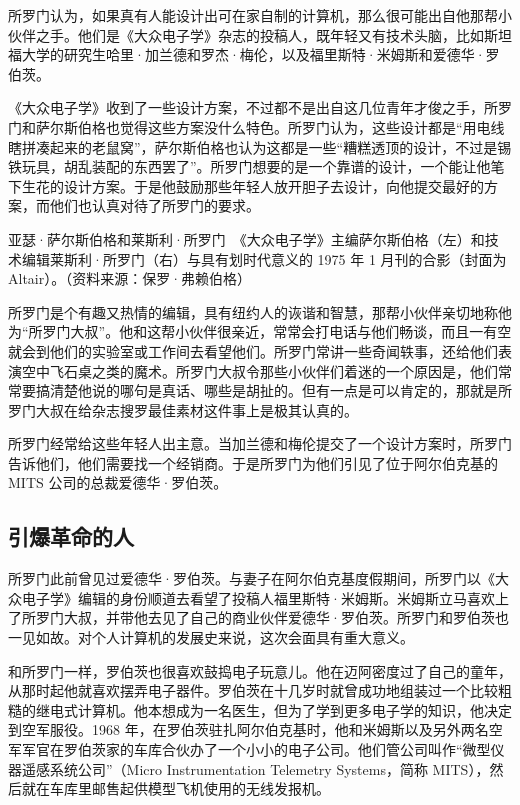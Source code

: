 \documentclass[12pt,UTF8]{ctexbook}
\begin{document}
所罗门认为，如果真有人能设计出可在家自制的计算机，那么很可能出自他那帮小伙伴之手。他们是《大众电子学》杂志的投稿人，既年轻又有技术头脑，比如斯坦福大学的研究生哈里·加兰德和罗杰·梅伦，以及福里斯特·米姆斯和爱德华·罗伯茨。

《大众电子学》收到了一些设计方案，不过都不是出自这几位青年才俊之手，所罗门和萨尔斯伯格也觉得这些方案没什么特色。所罗门认为，这些设计都是“用电线瞎拼凑起来的老鼠窝”，萨尔斯伯格也认为这都是一些“糟糕透顶的设计，不过是锡铁玩具，胡乱装配的东西罢了”。所罗门想要的是一个靠谱的设计，一个能让他笔下生花的设计方案。于是他鼓励那些年轻人放开胆子去设计，向他提交最好的方案，而他们也认真对待了所罗门的要求。



亚瑟·萨尔斯伯格和莱斯利·所罗门　《大众电子学》主编萨尔斯伯格（左）和技术编辑莱斯利·所罗门（右）与具有划时代意义的 1975 年 1 月刊的合影（封面为 Altair）。（资料来源：保罗·弗赖伯格）

所罗门是个有趣又热情的编辑，具有纽约人的诙谐和智慧，那帮小伙伴亲切地称他为“所罗门大叔”。他和这帮小伙伴很亲近，常常会打电话与他们畅谈，而且一有空就会到他们的实验室或工作间去看望他们。所罗门常讲一些奇闻轶事，还给他们表演空中飞石桌之类的魔术。所罗门大叔令那些小伙伴们着迷的一个原因是，他们常常要搞清楚他说的哪句是真话、哪些是胡扯的。但有一点是可以肯定的，那就是所罗门大叔在给杂志搜罗最佳素材这件事上是极其认真的。

所罗门经常给这些年轻人出主意。当加兰德和梅伦提交了一个设计方案时，所罗门告诉他们，他们需要找一个经销商。于是所罗门为他们引见了位于阿尔伯克基的 MITS 公司的总裁爱德华·罗伯茨。





\subsection{引爆革命的人}


所罗门此前曾见过爱德华·罗伯茨。与妻子在阿尔伯克基度假期间，所罗门以《大众电子学》编辑的身份顺道去看望了投稿人福里斯特·米姆斯。米姆斯立马喜欢上了所罗门大叔，并带他去见了自己的商业伙伴爱德华·罗伯茨。所罗门和罗伯茨也一见如故。对个人计算机的发展史来说，这次会面具有重大意义。

和所罗门一样，罗伯茨也很喜欢鼓捣电子玩意儿。他在迈阿密度过了自己的童年，从那时起他就喜欢摆弄电子器件。罗伯茨在十几岁时就曾成功地组装过一个比较粗糙的继电式计算机。他本想成为一名医生，但为了学到更多电子学的知识，他决定到空军服役。1968 年，在罗伯茨驻扎阿尔伯克基时，他和米姆斯以及另外两名空军军官在罗伯茨家的车库合伙办了一个小小的电子公司。他们管公司叫作“微型仪器遥感系统公司”（Micro Instrumentation Telemetry Systems，简称 MITS），然后就在车库里邮售起供模型飞机使用的无线发报机。
\end{document}
